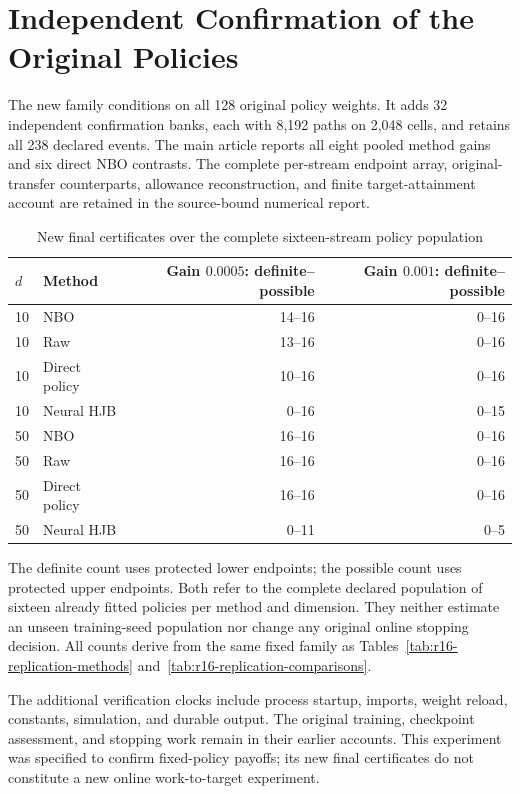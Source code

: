 \section{Independent Confirmation of the Original Policies}
\label{app:r16replicationrecord}
The new family conditions on all 128 original policy weights. It adds 32
independent confirmation banks, each with 8,192 paths on 2,048 cells, and
retains all 238 declared events. The main article reports all eight pooled
method gains and six direct NBO contrasts. The complete per-stream endpoint
array, original-transfer counterparts, allowance reconstruction, and finite
target-attainment account are retained in the source-bound numerical report.

\begin{table}[!htbp]
\centering\small
\caption{New final certificates over the complete sixteen-stream policy population}
\label{tab:r16replicationattainment}
\begin{tabular}{llrr}
\toprule
$d$ & Method & Gain $0.0005$: definite--possible & Gain $0.001$: definite--possible\\
\midrule
10 & NBO & 14--16 & 0--16\\
10 & Raw & 13--16 & 0--16\\
10 & Direct policy & 10--16 & 0--16\\
10 & Neural HJB & 0--16 & 0--15\\
50 & NBO & 16--16 & 0--16\\
50 & Raw & 16--16 & 0--16\\
50 & Direct policy & 16--16 & 0--16\\
50 & Neural HJB & 0--11 & 0--5\\
\bottomrule
\end{tabular}
\par\medskip\noindent\footnotesize\raggedright The definite count uses protected lower
endpoints; the possible count uses protected upper endpoints. Both refer to
the complete declared population of sixteen already fitted policies per
method and dimension. They neither estimate an unseen training-seed population
nor change any original online stopping decision. All counts derive from the
same fixed family as Tables~\ref{tab:r16-replication-methods}
and~\ref{tab:r16-replication-comparisons}.
\end{table}



The additional verification clocks include process startup, imports, weight
reload, constants, simulation, and durable output. The original training,
checkpoint assessment, and stopping work remain in their earlier accounts.
This experiment was specified to confirm fixed-policy payoffs; its new final
certificates do not constitute a new online work-to-target experiment.
